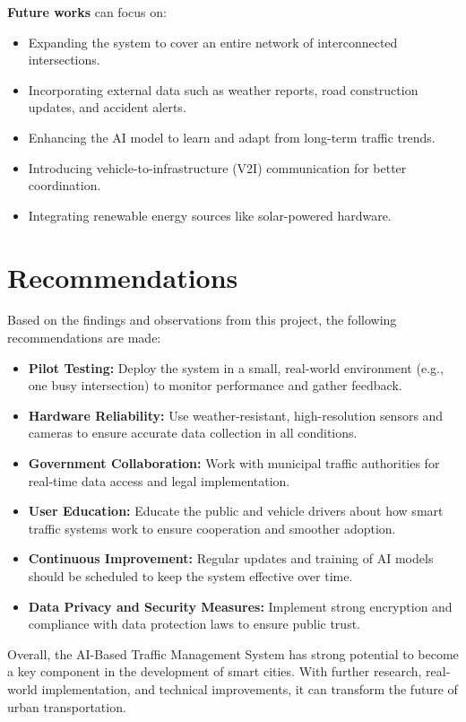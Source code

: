 \textbf{Future works} can focus on:
\begin{itemize}
    \item Expanding the system to cover an entire network of interconnected intersections.
    \item Incorporating external data such as weather reports, road construction updates, and accident alerts.
    \item Enhancing the AI model to learn and adapt from long-term traffic trends.
    \item Introducing vehicle-to-infrastructure (V2I) communication for better coordination.
    \item Integrating renewable energy sources like solar-powered hardware.
\end{itemize}

\section{Recommendations}

Based on the findings and observations from this project, the following recommendations are made:

\begin{itemize}
    \item \textbf{Pilot Testing:} Deploy the system in a small, real-world environment (e.g., one busy intersection) to monitor performance and gather feedback.
    \item \textbf{Hardware Reliability:} Use weather-resistant, high-resolution sensors and cameras to ensure accurate data collection in all conditions.
    \item \textbf{Government Collaboration:} Work with municipal traffic authorities for real-time data access and legal implementation.
    \item \textbf{User Education:} Educate the public and vehicle drivers about how smart traffic systems work to ensure cooperation and smoother adoption.
    \item \textbf{Continuous Improvement:} Regular updates and training of AI models should be scheduled to keep the system effective over time.
    \item \textbf{Data Privacy and Security Measures:} Implement strong encryption and compliance with data protection laws to ensure public trust.
\end{itemize}

Overall, the AI-Based Traffic Management System has strong potential to become a key component in the development of smart cities. With further research, real-world implementation, and technical improvements, it can transform the future of urban transportation.
